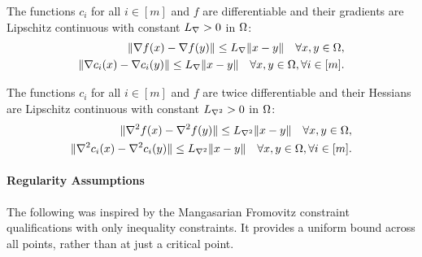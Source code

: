 
\begin{assumption}
\label{lipschitz_gradients_assumption}
The functions $c_i$ for all $i \in [m]$ and $f$ are differentiable and their gradients are Lipschitz continuous with constant ${L_{\nabla}} > 0$ in $ \Omega $:
\begin{align*}
\|\nabla f(x) - \nabla f(y)\| \le {L_{\nabla}} \|x - y\| \quad \forall x,y \in \Omega, \\
\|\nabla c_i(x) - \nabla c_i(y)\| \le {L_{\nabla}} \|x - y\| \quad \forall x,y \in \Omega, \forall i \in [m].
\end{align*}
\end{assumption}


\begin{assumption}
\label{lipschitz_hessians_assumption}
The functions $c_i$ for all $i \in [m]$ and $f$ are twice differentiable and their Hessians are Lipschitz continuous with constant ${L_{\nabla^2}} > 0$ in $ \Omega $:
\begin{align*}
\|\nabla^2 f(x) - \nabla^2 f(y)\| \le {L_{\nabla^2}} \|x - y\| \quad \forall x,y \in \Omega, \\
\|\nabla^2 c_i(x) - \nabla^2 c_i(y)\| \le {L_{\nabla^2}} \|x - y\| \quad \forall x,y \in \Omega, \forall i \in [m] .
\end{align*}
\end{assumption}


\paragraph*{Regularity Assumptions}


The following was inspired by the Mangasarian Fromovitz constraint qualifications with only inequality constraints.
It provides a uniform bound across all points, rather than at just a critical point.

% 

